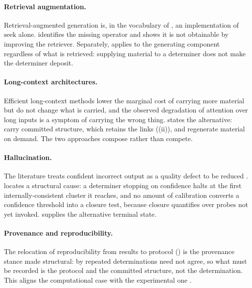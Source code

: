 \documentclass[11pt,twocolumn,a4paper]{article}
\theoremstyle{dirthm}
\theoremstyle{definition}
\theoremstyle{remark}
\newcommand{\seek}{\mathrm{seek}}
\begin{document}
\paragraph{Retrieval augmentation.}
Retrieval-augmented generation \citep{lewis2020} is, in the vocabulary of
, an implementation of $\seek$ alone.
 identifies the missing operator and
 shows it is not obtainable by improving the
retriever. Separately,  applies to the generating
component regardless of what is retrieved: supplying material to a determiner
does not make the determiner deposit.

\paragraph{Long-context architectures.}
Efficient long-context methods \citep{tay2022,vaswani2017} lower the marginal
cost of carrying more material but do not change what is carried, and the
observed degradation of attention over long inputs \citep{liu2024} is a
symptom of carrying the wrong thing.  states the
alternative: carry committed structure, which retains the links
((ii)), and regenerate material on demand. The two approaches
compose rather than compete.

\paragraph{Hallucination.}
The literature treats confident incorrect output as a quality defect to be
reduced \citep{ji2023,bender2021}.  locates a
structural cause: a determiner stopping on confidence halts at the first
internally-consistent cluster it reaches, and no amount of calibration
converts a confidence threshold into a closure test, because closure quantifies
over probes not yet invoked.  supplies the alternative
terminal state.

\paragraph{Provenance and reproducibility.}
The relocation of reproducibility from results to protocol
() is the provenance stance \citep{moreau2013,davidson2008}
made structural: by  repeated determinations need not agree,
so what must be recorded is the protocol and the committed structure, not the
determination. This aligns the computational case with the experimental one
\citep{peng2011,sandve2013,openscience2015}.
\end{document}
